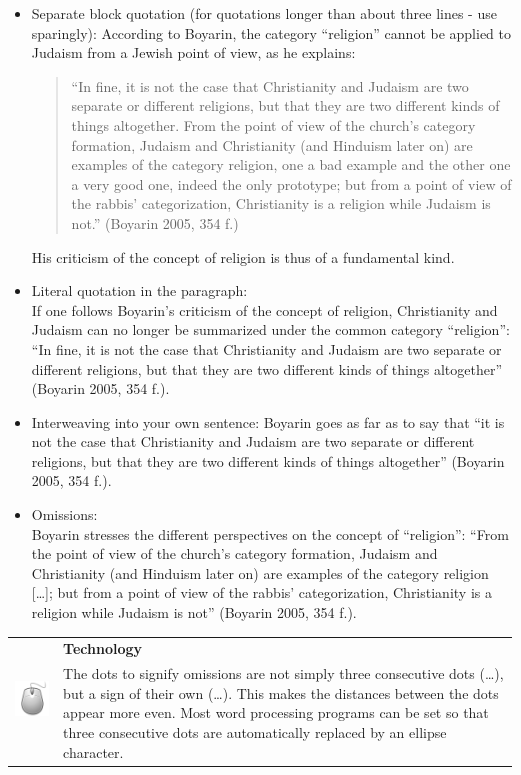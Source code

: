 \documentclass[
  english,
]{scrreprt}
\newlength{\iconwidth}
\newenvironment{displaybox}[2]{%
    \begin{center}
        \setlength\arrayrulewidth{0.75pt}%
        \arrayrulecolor{white}%
        \renewcommand{\arraystretch}{1.3}%
        \begin{tabular}{p{\iconwidth}p{\linewidth-4\tabcolsep-\iconwidth}}
            \multirow{2}{*}{#2}&\cellcolor{boxheadcol}\textbf{\sffamily\color{white}#1} \\%
            \hhline{~-}%
            &\cellcolor{boxcol}%
}{%
            \\
        \end{tabular}
        \arrayrulecolor{black}
    \end{center}
}
\newenvironment{Technology}{%
\begin{displaybox}{Technology}{\includegraphics[width=\iconwidth]{images/icon-technik}}}%
{\end{displaybox}}
\begin{document}
\begin{itemize}
\item
  Separate block quotation (for quotations longer than about three lines - use sparingly): According to Boyarin, the category “religion” cannot be applied to Judaism from a Jewish point of view, as he explains:

  \begin{quote}
  “In fine, it is not the case that Christianity and Judaism are two separate or different religions, but that they are two different kinds of things altogether. From the point of view of the church’s category formation, Judaism and Christianity (and Hinduism later on) are examples of the category religion, one a bad example and the other one a very good one, indeed the only prototype; but from a point of view of the rabbis’ categorization, Christianity is a religion while Judaism is not.” (Boyarin 2005, 354 f.)
  \end{quote}

  His criticism of the concept of religion is thus of a fundamental kind.
\item
  Literal quotation in the paragraph:\\
  If one follows Boyarin’s criticism of the concept of religion, Christianity and Judaism can no longer be summarized under the common category “religion”: “In fine, it is not the case that Christianity and Judaism are two separate or different religions, but that they are two different kinds of things altogether” (Boyarin 2005, 354 f.).
\item
  Interweaving into your own sentence: Boyarin goes as far as to say that “it is not the case that Christianity and Judaism are two separate or different religions, but that they are two different kinds of things altogether” (Boyarin 2005, 354 f.).
\item
  Omissions:\\
  Boyarin stresses the different perspectives on the concept of “religion”: “From the point of view of the church’s category formation, Judaism and Christianity (and Hinduism later on) are examples of the category religion {[}…{]}; but from a point of view of the rabbis’ categorization, Christianity is a religion while Judaism is not” (Boyarin 2005, 354 f.).
\end{itemize}

\begin{Technology}

The dots to signify omissions are not simply three consecutive dots (…), but a sign of their own (…). This makes the distances between the dots appear more even. Most word processing programs can be set so that three consecutive dots are automatically replaced by an ellipse character.

\end{Technology}
\end{document}
